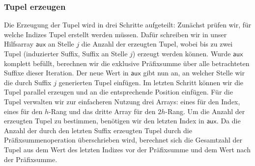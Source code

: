 \subsubsection{Tupel erzeugen}
Die Erzeugung der Tupel wird in drei Schritte aufgeteilt: Zunächst prüfen wir, für welche Indizes Tupel erstellt werden müssen. Dafür schreiben wir in unser Hilfsarray $\mathsf{aux}$ an Stelle $j$ die Anzahl der erzeugten Tupel, wobei bis zu zwei Tupel (induzierter Suffix, Suffix an Stelle $j$) erzeugt werden können. Wurde $\mathsf{aux}$ komplett befüllt, berechnen wir die exklusive Präfixsumme über alle betrachteten Suffixe dieser Iteration. Der neue Wert in $\mathsf{aux}$ gibt nun an, an welcher Stelle wir die durch Suffix $j$ generierten Tupel einfügen. Im letzten Schritt können wir die Tupel parallel erzeugen und an die entsprechende Position einfügen. 
Für die Tupel verwalten wir zur einfacheren Nutzung drei Arrays: eines für den Index, eines für den $h$-Rang und das dritte Array für den $2h$-Rang. Um die Anzahl der erzeugten Tupel zu bestimmen, benötigen wir den letzten Index in $\mathsf{aux}$. Da die Anzahl der durch den letzten Suffix erzeugten Tupel durch die Präfixsummenoperation überschrieben wird, berechnet sich die Gesamtzahl der Tupel aus dem Wert des letzten Indizes vor der Präfixsumme und dem Wert nach der Präfixsumme.

